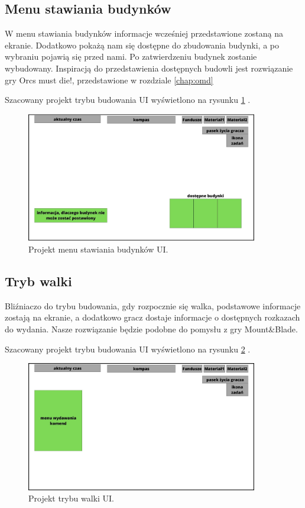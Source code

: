 \subsection{Menu stawiania budynków}
 W menu stawiania budynków informacje wcześniej przedstawione zostaną na ekranie. Dodatkowo pokażą nam się dostępne do zbudowania budynki, a po wybraniu pojawią się przed nami. Po zatwierdzeniu budynek zostanie wybudowany.
	Inspiracją do przedstawienia dostępnych budowli jest rozwiązanie gry Orcs must die!, przedstawione w rozdziale \ref{chap:omd}


    Szacowany projekt trybu budowania UI wyświetlono na rysunku \ref{fig:ui_bud} .
    \begin{figure}[htbp]
        \centering
        \includegraphics[width=0.9\textwidth]{images/ui/ui_proj_budowanie.jpg}
        \caption{Projekt menu stawiania budynków UI.
        }\label{fig:ui_bud}
    \end{figure}


\subsection{Tryb walki}
Bliźniaczo do trybu budowania, gdy rozpocznie się walka, podstawowe informacje zostają na ekranie, a dodatkowo gracz dostaje informacje o dostępnych rozkazach do wydania. Nasze rozwiązanie będzie podobne do pomysłu z gry Mount\&Blade.

Szacowany projekt trybu budowania UI wyświetlono na rysunku \ref{fig:ui_wal} .
    \begin{figure}[htbp]
        \centering
        \includegraphics[width=0.9\textwidth]{images/ui/ui_proj_walka.jpg}
        \caption{Projekt trybu walki UI.
        }\label{fig:ui_wal}
    \end{figure}
